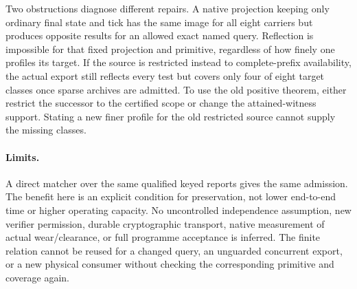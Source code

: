 \documentclass[11pt]{article}
\begin{document}
Two obstructions diagnose different repairs. A native projection
keeping only ordinary final state and tick has the same image for all
eight carriers but produces opposite results for an allowed exact
named query. Reflection is impossible for that fixed projection and
primitive, regardless of how finely one profiles its target. If the
source is restricted instead to complete-prefix availability, the
actual export still reflects every test but covers only four of eight
target classes once sparse archives are admitted. To use the old
positive theorem, either restrict the successor to the certified
scope or change the attained-witness support. Stating a new finer
profile for the old restricted source cannot supply the missing classes.

\paragraph{Limits.}
A direct matcher over the same qualified keyed reports gives the same
admission. The benefit here is an explicit condition for preservation,
not lower end-to-end time or higher operating capacity. No uncontrolled
independence assumption, new verifier permission, durable cryptographic
transport, native measurement of actual wear/clearance, or full
programme acceptance is inferred. The finite relation cannot be reused
for a changed query, an unguarded concurrent export, or a new physical
consumer without checking the corresponding primitive and coverage
again.
\end{document}
